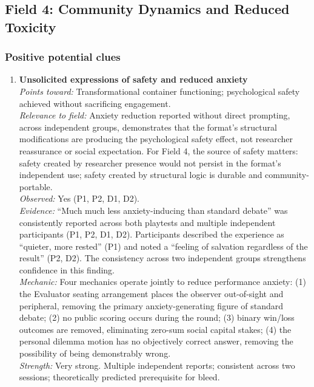 \documentclass[12pt]{article}
\begin{document}
\bigskip

\subsection*{Field 4: Community Dynamics and Reduced Toxicity}

\subsubsection*{Positive potential clues}

\begin{enumerate}

\item \textbf{Unsolicited expressions of safety and reduced anxiety}\\
\textit{Points toward:} Transformational container functioning; psychological safety achieved without sacrificing engagement.\\
\textit{Relevance to field:} Anxiety reduction reported without direct prompting, across independent groups, demonstrates that the format's structural modifications are producing the psychological safety effect, not researcher reassurance or social expectation. For Field 4, the source of safety matters: safety created by researcher presence would not persist in the format's independent use; safety created by structural logic is durable and community-portable.\\
\textit{Observed:} Yes (P1, P2, D1, D2).\\
\textit{Evidence:} ``Much much less anxiety-inducing than standard debate'' was consistently reported across both playtests and multiple independent participants (P1, P2, D1, D2). Participants described the experience as ``quieter, more rested'' (P1) and noted a ``feeling of salvation regardless of the result'' (P2, D2). The consistency across two independent groups strengthens confidence in this finding.\\
\textit{Mechanic:} Four mechanics operate jointly to reduce performance anxiety: (1) the Evaluator seating arrangement places the observer out-of-sight and peripheral, removing the primary anxiety-generating figure of standard debate; (2) no public scoring occurs during the round; (3) binary win/loss outcomes are removed, eliminating zero-sum social capital stakes; (4) the personal dilemma motion has no objectively correct answer, removing the possibility of being demonstrably wrong.\\
\textit{Strength:} Very strong. Multiple independent reports; consistent across two sessions; theoretically predicted prerequisite for bleed.


\end{enumerate}
\end{document}
